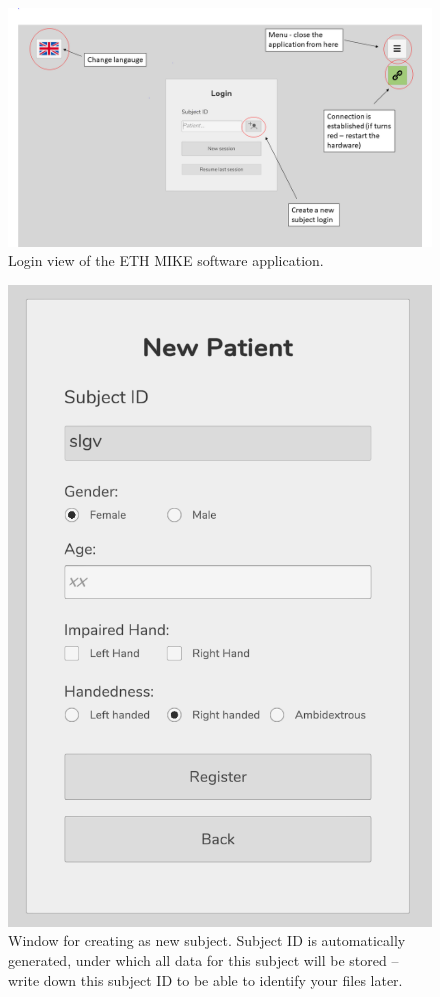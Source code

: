 \documentclass[10pt,oneside,a4paper]{article}
\begin{document}
\begin{figure}[h!]
\begin{center}
\includegraphics[width=\columnwidth]{images/TabletScreenshots/LoginView.png}
\caption{Login view of the ETH MIKE software application.}
\label{fig:LoginView}
\end{center}
\end{figure}

\begin{figure}[h!]
\begin{center}
\includegraphics[width=0.48\columnwidth]{images/Assessments/NewSubject.png}
\caption{Window for creating as new subject. Subject ID is automatically generated, under which all data for this subject will be stored – write down this subject ID to be able to identify your files later.}
\label{fig:Registration}
\end{center}
\end{figure}
\end{document}
